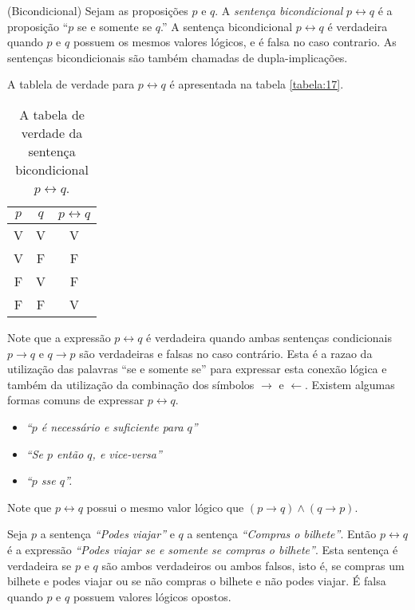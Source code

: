 \begin{defn}
\label{def16}
(Bicondicional) Sejam as proposições $p$ e $q$. A \emph{sentença bicondicional}
$p \leftrightarrow q$ é a proposição ``$p$ se e somente se $q$.'' A sentença
bicondicional $p \leftrightarrow q$ é verdadeira quando $p$ e $q$ possuem os
mesmos valores lógicos, e é falsa no caso contrario. As sentenças
bicondicionais são também chamadas de dupla-implicações.
\end{defn}

A tablela de verdade para $p \leftrightarrow q$ é apresentada na tabela
\ref{tabela:17}. 

\begin{table}[H]
\centering
\begin{tabular}{|c|c|c|}%
\toprule
\textbf{$p$} & \textbf{$q$} & \textbf{$p \leftrightarrow q$}\\ 
\midrule
V &	V & V\\
V &	F & F\\
F &	V & F\\
F &	F & V\\
\bottomrule%
\end{tabular}%
\caption{A tabela de verdade da sentença bicondicional $p \leftrightarrow q$.}
\label{tabela:16}
\end{table}

Note que a expressão $p \leftrightarrow q$ é verdadeira quando ambas sentenças
condicionais $p \to q$ e $q \to p$ são verdadeiras e falsas no caso contrário.
Esta é a razao da utilização das palavras ``se e somente se'' para expressar
esta conexão lógica e também da utilização da combinação dos símbolos $\rightarrow$ e $\leftarrow$. Existem algumas formas comuns de
expressar $p \leftrightarrow q$.
\begin{itemize}
  \item \emph{``$p$ é necessário e suficiente para $q$''}
  \item \emph{``Se $p$ então $q$, e vice-versa''}
  \item \emph{``$p$ sse $q$''.}
\end{itemize}

Note que $p \leftrightarrow q$ possui o mesmo valor lógico que $(p \to q) \land
(q \to p)$.

\label{exem18}
\begin{exmp}
Seja $p$ a sentença \emph{``Podes viajar''} e $q$ a sentença \emph{``Compras o
bilhete''}.
Então $p \leftrightarrow q$ é a expressão \emph{``Podes viajar se e somente se
compras o bilhete''}. Esta sentença é verdadeira se $p$ e $q$ são ambos
verdadeiros ou ambos falsos, isto é, se compras um bilhete e podes viajar ou se
não compras o bilhete e não podes viajar. É falsa quando $p$ e $q$ possuem valores lógicos
opostos.
\end{exmp}

